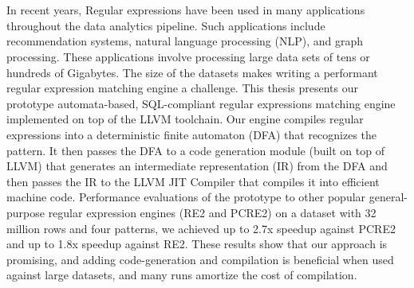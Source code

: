 \chapter{\abstractname}
In recent years, Regular expressions have been used in many applications throughout the data analytics pipeline. Such applications include recommendation systems, natural language processing (NLP), and graph processing. These applications involve processing large data sets of tens or hundreds of Gigabytes. The size of the datasets makes writing a performant regular expression matching engine a challenge. This thesis presents our prototype automata-based, SQL-compliant regular expressions matching engine implemented on top of the LLVM toolchain. Our engine compiles regular expressions into a deterministic finite automaton (DFA) that recognizes the pattern. It then passes the DFA to a code generation module (built on top of LLVM) that generates an intermediate representation (IR) from the DFA and then passes the IR to the LLVM JIT Compiler that compiles it into efficient machine code. Performance evaluations of the prototype to other popular general-purpose regular expression engines (RE2 and PCRE2) on a dataset with 32 million rows and four patterns, we achieved up to 2.7x speedup against PCRE2 and up to 1.8x speedup against RE2. These results show that our approach is promising, and adding code-generation and compilation is beneficial when used against large datasets, and many runs amortize the cost of compilation.